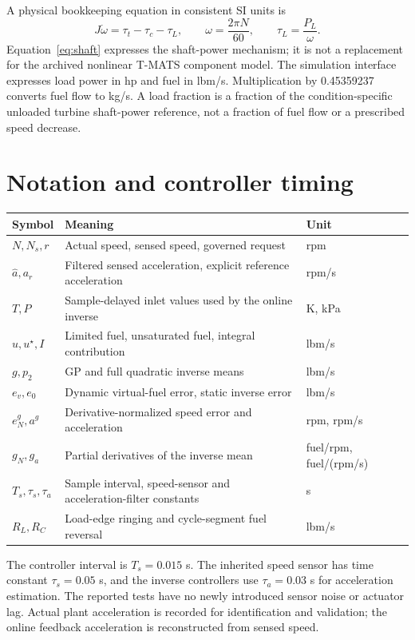 A physical bookkeeping equation in consistent SI units is
\begin{equation}
J\dot\omega=\tau_t-\tau_c-\tau_L,\qquad \omega=\frac{2\pi N}{60},\qquad \tau_L=\frac{P_L}{\omega}.
\label{eq:shaft}
\end{equation}
Equation~\eqref{eq:shaft} expresses the shaft-power mechanism; it is not a replacement for the archived nonlinear T-MATS component model. The simulation interface expresses load power in hp and fuel in lbm/s. Multiplication by 0.45359237 converts fuel flow to kg/s. A load fraction is a fraction of the condition-specific unloaded turbine shaft-power reference, not a fraction of fuel flow or a prescribed speed decrease.

\section{Notation and controller timing}
\begin{longtable}{@{}p{.16\linewidth}p{.54\linewidth}p{.23\linewidth}@{}}
\toprule Symbol & Meaning & Unit\\\midrule
$N,N_s,r$ & Actual speed, sensed speed, governed request & rpm\\
$\hat a,a_r$ & Filtered sensed acceleration, explicit reference acceleration & rpm/s\\
$T,P$ & Sample-delayed inlet values used by the online inverse & K, kPa\\
$u,u^\star,I$ & Limited fuel, unsaturated fuel, integral contribution & lbm/s\\
$g,p_2$ & GP and full quadratic inverse means & lbm/s\\
$e_v,e_0$ & Dynamic virtual-fuel error, static inverse error & lbm/s\\
$e_N^g,a^g$ & Derivative-normalized speed error and acceleration & rpm, rpm/s\\
$g_N,g_a$ & Partial derivatives of the inverse mean & fuel/rpm, fuel/(rpm/s)\\
$T_s,\tau_s,\tau_a$ & Sample interval, speed-sensor and acceleration-filter constants & s\\
$R_L,R_C$ & Load-edge ringing and cycle-segment fuel reversal & lbm/s\\
\bottomrule
\end{longtable}
The controller interval is $T_s=0.015$ s. The inherited speed sensor has time constant $\tau_s=0.05$ s, and the inverse controllers use $\tau_a=0.03$ s for acceleration estimation. The reported tests have no newly introduced sensor noise or actuator lag. Actual plant acceleration is recorded for identification and validation; the online feedback acceleration is reconstructed from sensed speed.

